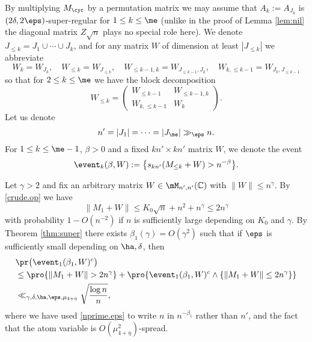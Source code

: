 \documentclass[aop,preprint]{imsart}
\theoremstyle{plain}
\theoremstyle{definition}
\theoremstyle{remark}
\numberwithin{equation}{section}
\numberwithin{theorem}{section}
\begin{document}
By multiplying $M_{\cyc}$ by a permutation matrix we may assume that $A_k:= A_{J_k}$ is $(2\delta,2\eps)$-super-regular for $1\le k\le \me $ (unlike in the proof of Lemma \ref{lem:nil} the diagonal matrix $Z\sqrt{n}$ plays no special role here).
We denote $J_{\le k}= J_1\cup\cdots\cup J_k$, and for any matrix $W$ of dimension at least $|J_{\le k}|$ we abbreviate
\begin{equation}
W_k=W_{J_k},\quad W_{\le k} = W_{J_{\le k}},\quad W_{\le k-1, k} = W_{J_{\le k-1}, J_{k}}, \quad W_{k,\le k-1}= W_{J_{k}, J_{\le k-1}}
\end{equation}
so that for $2\le k\le \me $ we have the block decomposition
\begin{equation}
W_{\le k} = \begin{pmatrix} W_{\le k-1} & W_{\le k-1,k}\\ W_{k,\le k-1} & W_{k}\end{pmatrix}.
\end{equation}
Let us denote 
\begin{equation}	\label{nprime.eps}
n'= |J_1|=\cdots=|J_{\me }| \gg_\eps n.
\end{equation}
For $1\le k\le \me -1$, $\beta>0$ and a fixed $kn'\times kn'$ matrix $W$, we denote the event 
\begin{equation}
\event_k(\beta,W) := \big\{ s_{kn'}(M_{\le k} + W) > n^{-\beta}\big\}.
\end{equation}

Let $\gamma>2$ and fix an arbitrary matrix $W\in \mM_{n',n'}(\C)$ with $\|W\|\le n^\gamma$.
By \eqref{crude.op} we have
\begin{equation}
\|M_1+W\| \le K_0\sqrt{n} + n^2 + n^\gamma \le 2n^\gamma
\end{equation}
with probability $1-O(n^{-2})$ if $n$ is sufficiently large depending on $K_0$ and $\gamma$. 
By Theorem \ref{thm:super} there exists $\beta_1(\gamma) = O(\gamma^2)$ such that if $\eps$ is sufficiently small depending on $\ha,\delta$, then 
\begin{align}
&\pr\big(\event_1(\beta_1,W)^c\big) \notag\\
&\le \pro{ \|M_1+W\|>2n^\gamma} + \pro{ \event_1(\beta_1,W)^c\wedge \{ \|M_1+W\|\le 2n^\gamma\}}\notag\\
&\ll_{\gamma,\delta,\ha,\eps,\mu_{4+\eta}} \sqrt{\frac{\log n}{n}},		\label{cyc:event1}
\end{align}
where we have used \eqref{nprime.eps} to write $n$ in $n^{-\beta_1}$ rather than $n'$, and the fact that the atom variable is $O(\mu_{4+\eta}^2)$-spread. 
\end{document}
